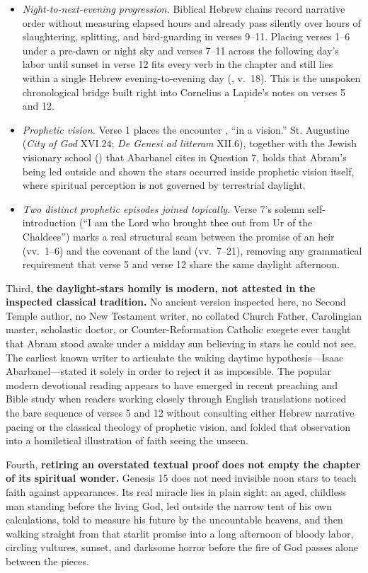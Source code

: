 \begin{itemize}
  \item \emph{Night-to-next-evening progression.} Biblical Hebrew  chains record narrative order without measuring elapsed hours and already pass silently over hours of slaughtering, splitting, and bird-guarding in verses 9--11. Placing verses 1--6 under a pre-dawn or night sky and verses 7--11 across the following day's labor until sunset in verse 12 fits every verb in the chapter and still lies within a single Hebrew evening-to-evening day (, v.~18). This is the unspoken chronological bridge built right into Cornelius a Lapide's notes on verses 5 and 12.
  \item \emph{Prophetic vision.} Verse 1 places the encounter , ``in a vision.'' St. Augustine (\emph{City of God} XVI.24; \emph{De Genesi ad litteram} XII.6), together with the Jewish visionary school () that Abarbanel cites in Question 7, holds that Abram's being led outside and shown the stars occurred inside prophetic vision itself, where spiritual perception is not governed by terrestrial daylight.
  \item \emph{Two distinct prophetic episodes joined topically.} Verse 7's solemn self-introduction (``I am the Lord who brought thee out from Ur of the Chaldees'') marks a real structural seam between the promise of an heir (vv.~1--6) and the covenant of the land (vv.~7--21), removing any grammatical requirement that verse 5 and verse 12 share the same daylight afternoon.
\end{itemize}

Third, \textbf{the daylight-stars homily is modern, not attested in the inspected classical tradition.} No ancient version inspected here, no Second Temple author, no New Testament writer, no collated Church Father, Carolingian master, scholastic doctor, or Counter-Reformation Catholic exegete ever taught that Abram stood awake under a midday sun believing in stars he could not see. The earliest known writer to articulate the waking daytime hypothesis---Isaac Abarbanel---stated it solely in order to reject it as impossible. The popular modern devotional reading appears to have emerged in recent preaching and Bible study when readers working closely through English translations noticed the bare sequence of verses 5 and 12 without consulting either Hebrew narrative pacing or the classical theology of prophetic vision, and folded that observation into a homiletical illustration of faith seeing the unseen.

Fourth, \textbf{retiring an overstated textual proof does not empty the chapter of its spiritual wonder.} Genesis 15 does not need invisible noon stars to teach faith against appearances. Its real miracle lies in plain sight: an aged, childless man standing before the living God, led outside the narrow tent of his own calculations, told to measure his future by the uncountable heavens, and then walking straight from that starlit promise into a long afternoon of bloody labor, circling vultures, sunset, and darksome horror before the fire of God passes alone between the pieces.
